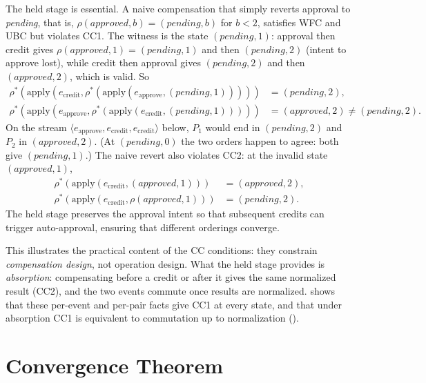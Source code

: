 \documentclass[11pt,a4paper]{article}
\theoremstyle{plain}
\theoremstyle{definition}
\theoremstyle{remark}
\begin{document}
The held stage is essential.  A naive compensation that simply reverts
approval to \textit{pending}, that is,
$\rho(\textit{approved}, b) = (\textit{pending}, b)$ for $b < 2$, satisfies WFC
and UBC but violates CC1.  The witness is the state $(\textit{pending}, 1)$:
approval then credit gives $\rho(\textit{approved}, 1) = (\textit{pending}, 1)$
and then $(\textit{pending}, 2)$ (intent to approve lost), while credit then
approval gives $(\textit{pending}, 2)$ and then $(\textit{approved}, 2)$, which
is valid.  So
\begin{align*}
\rho^*(\mathrm{apply}(e_{\mathrm{credit}},
  \rho^*(\mathrm{apply}(e_{\mathrm{approve}}, (\textit{pending}, 1)))))
&= (\textit{pending}, 2), \\
\rho^*(\mathrm{apply}(e_{\mathrm{approve}},
  \rho^*(\mathrm{apply}(e_{\mathrm{credit}}, (\textit{pending}, 1)))))
&= (\textit{approved}, 2) \neq (\textit{pending}, 2).
\end{align*}
On the stream $\langle e_{\mathrm{approve}}, e_{\mathrm{credit}},
e_{\mathrm{credit}} \rangle$ below, $P_1$ would end in $(\textit{pending}, 2)$
and $P_2$ in $(\textit{approved}, 2)$.  (At $(\textit{pending}, 0)$ the two
orders happen to agree: both give $(\textit{pending}, 1)$.)  The naive revert
also violates CC2: at the invalid state $(\textit{approved}, 1)$,
\begin{align*}
\rho^*(\mathrm{apply}(e_{\mathrm{credit}}, (\textit{approved}, 1)))
&= (\textit{approved}, 2), \\
\rho^*(\mathrm{apply}(e_{\mathrm{credit}}, \rho(\textit{approved}, 1)))
&= (\textit{pending}, 2).
\end{align*}
The held stage preserves the approval intent so that
subsequent credits can trigger auto-approval, ensuring that different orderings
converge.

This illustrates the practical content of the CC conditions: they constrain
\emph{compensation design}, not operation design.  What the held stage provides
is \emph{absorption}: compensating before a credit or after it gives the same
normalized result (CC2), and the two events commute once results are
normalized.   shows that these per-event and per-pair facts
give CC1 at every state, and that under absorption CC1 is equivalent to
commutation up to normalization ().

\section{Convergence Theorem}
\label{sec:convergence}
\end{document}
